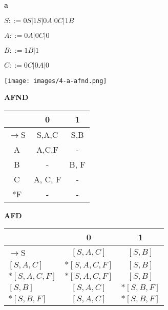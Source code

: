 \documentclass[ ]{article}
\begin{document}
		\textbf{a}
		
		$S::= 0S | 1S | 0A | 0C | 1B$
		
		$A::= 0A | 0C | 0$
		
		$B::= 1B | 1$
		
		$C::= 0C | 0A | 0$
		
		
		\texttt{[image: images/4-a-afnd.png]}
		
\begin{center}
    \begin{minipage}[t]{0.48\textwidth} %
        \centering %
        \textbf{AFND}\\ %
        \vspace{0.2cm} %
        \begin{tabular}{|c|c|c|} %
            \toprule %
            & 0 & 1 \\
            \midrule %
            $\to$S & S,A,C & S,B\\
            A & A,C,F & -\\
            B & - &  B, F\\
            C & A, C, F & -\\
            *F & - & - \\
            \bottomrule %
        \end{tabular}
    \end{minipage}%
    \hfill %
    \begin{minipage}[t]{0.48\textwidth} %
        \centering %
        \textbf{AFD}\\ %
        \vspace{0.2cm} %
        \begin{tabular}{|l|c|c|} %
            \toprule %
            & 0 & 1 \\
            \midrule %
            $\to$S & $[S,A,C]$ & $[S,B]$\\ %
            $[S,A,C]$ & $*[S,A,C,F]$ & $[S,B]$ \\
            $*[S,A,C,F]$ & $*[S,A,C,F]$ & $[S,B]$ \\
            $[S,B]$ & $[S,A,C]$ & $*[S,B,F]$\\
            $*[S,B,F]$ & $[S,A,C]$ & $*[S,B,F]$\\
            \bottomrule %
        \end{tabular}
    \end{minipage}
\end{center}
		
\end{document}
